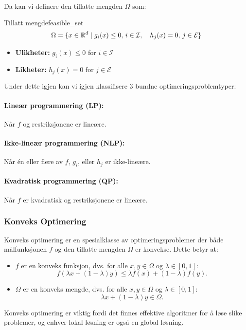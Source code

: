 Da kan vi definere den tillatte mengden \(\Omega\) som:
\begin{definition}{Tillatt mengde}{feasible_set}
	\[
		\Omega = \{ x \in \mathbb{R}^d \mid g_i(x) \leq 0, \, i \in \mathcal{I}, \quad h_j(x) = 0, \, j \in \mathcal{E} \}
	\]
	\begin{itemize}
		\item \textbf{Ulikheter:} \(g_i(x) \leq 0\) for \(i \in \mathcal{I}\)
		\item \textbf{Likheter:} \(h_j(x) = 0\) for \(j \in \mathcal{E}\)
	\end{itemize}
\end{definition}


Under dette igjen kan vi igjen klassifisere 3 bundne optimeringsproblemtyper:
\paragraph{Lineær programmering (LP):} Når \(f\) og restriksjonene er lineære.
\paragraph{Ikke-lineær programmering (NLP):} Når én eller flere av \(f\), \(g_i\), eller \(h_j\) er ikke-lineære.
\paragraph{Kvadratisk programmering (QP):} Når \(f\) er kvadratisk og restriksjonene er lineære.

\subsubsection{Konveks Optimering}
Konveks optimering er en spesialklasse av optimeringsproblemer der både målfunksjonen \(f\) og den tillatte mengden \(\Omega\) er konvekse. Dette betyr at:

\begin{itemize}
	\item \(f\) er en konveks funksjon, dvs. for alle \(x, y \in \Omega\) og \(\lambda \in [0, 1]\):
	      \[
		      f(\lambda x + (1-\lambda)y) \leq \lambda f(x) + (1-\lambda)f(y).
	      \]
	\item \(\Omega\) er en konveks mengde, dvs. for alle \(x, y \in \Omega\) og \(\lambda \in [0, 1]\):
	      \[
		      \lambda x + (1-\lambda)y \in \Omega.
	      \]
\end{itemize}

Konveks optimering er viktig fordi det finnes effektive algoritmer for å løse slike problemer, og enhver lokal løsning er også en global løsning.

